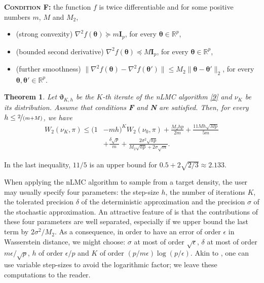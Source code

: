 \documentclass[aoap,preprint,reqno,a4paper]{imsart} %
\newcommand{\RR}{\mathbb{R}}
\newcommand{\eps}{\epsilon}
\newcommand{\btheta}{\boldsymbol{\theta}}
\newcommand{\bvartheta}{\boldsymbol{\vartheta}}
\newcommand{\bfI}{\mathbf I}
\newtheorem{theorem}{Theorem}
\begin{document}
\noindent\textbf{\textsc{Condition F:}} the function $f$ is twice differentiable and for some positive numbers
$m$, $M$ and $M_2$,
\vspace{-10pt}
\begin{itemize}\itemsep=3pt
\item (strong convexity) $\nabla^2 f(\btheta)\succeq m\bfI_p$, for every $\btheta\in\RR^p$,
\item (bounded second derivative) $\nabla^2 f(\btheta)\preceq M\bfI_p$, for every $\btheta\in\RR^p$,
\item (further smoothness) $\|\nabla^2 f(\btheta)-\nabla^2 f(\btheta')\|\le M_2\|\btheta-\btheta'\|_2$, for every $\btheta,\btheta'\in\RR^p$.
\end{itemize}


\begin{theorem}\label{thFour}
Let $\bvartheta_{K,h}$ be the $K$-th iterate of the nLMC algorithm \eqref{9} and
$\nu_K$ be its distribution. Assume that conditions {\bf F}  and {\bf N} are
satisfied. Then, for every  $h\le \nicefrac2{(m+M)}$, we have
\begin{align}\label{A2}
W_2(\nu_K, \pi) \le (1&-mh)^{K} W_2(\nu_0,\pi) +
		\frac{M_2 hp}{2m}+ \frac{11 M h\sqrt{Mp}}{5m}\\
		&+ \frac{\delta\sqrt{p}}{m}  + \frac{2\sigma^2 \sqrt{hp} }{M_2\sqrt{hp} + 2\sigma \sqrt{m}}.
\end{align}
\end{theorem}
In the last inequality, $11/5$ is an upper bound for $0.5+2\sqrt{2/3}\approx 2.133$.




When applying the nLMC algorithm to sample from a target density, the user may usually specify
four parameters: the step-size $h$, the number of iterations $K$, the tolerated precision $\delta$
of the deterministic approximation and the precision $\sigma$ of the stochastic approximation. An
attractive  feature of  is that the contributions of these four parameters are well
separated, especially if we upper bound the last term by $2\sigma^2/M_2$. As a consequence,
in order to have an error of order $\eps$ in Wasserstein distance, we might choose:
$\sigma$ at most of order $\sqrt{\eps}$, $\delta$ at most of order $m\eps/\sqrt{p}$,
$h$ of order $\eps/p$ and $K$ of order $(p/m\eps)\log(p/\eps)$. Akin to , one can
use variable step-sizes to avoid the logarithmic factor; we leave these computations
to the reader.
\end{document}

